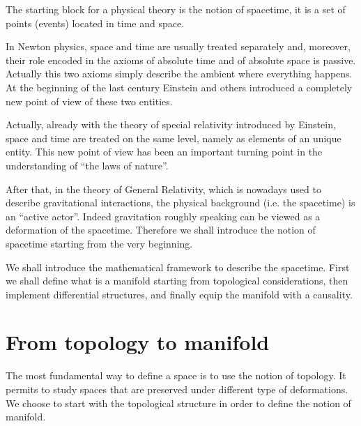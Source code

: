 \documentclass[11pt]{book}
\theoremstyle{break}
\begin{document}
\bigskip

The starting block for a physical theory is the notion of spacetime, it is a set of points (events) located in time and space. 


In Newton physics, space and time are usually treated separately and, moreover, their role encoded in the axioms of absolute time and of absolute space is passive. Actually this two axioms simply describe the ambient where everything happens. At the beginning of the last century Einstein and others introduced a completely new point of view of these two entities.


Actually, already with the theory of special relativity introduced by Einstein, space and time are treated on the same level, namely as elements of an unique entity. This new point of view has been an important turning point in the understanding of ``the laws of nature''.


After that, in the theory of General Relativity, which is nowadays used to describe gravitational interactions, the physical background (i.e. the spacetime) is an ``active actor''. Indeed gravitation roughly speaking can be viewed as a deformation of the spacetime. Therefore we shall introduce the notion of spacetime starting from the very beginning.


We shall introduce the mathematical framework to describe the spacetime. First we shall define what is a manifold starting from topological considerations, then implement differential structures, and finally equip the manifold with a causality.


\section{From topology to manifold}
\label{p:TOPO_M}


The most fundamental way to define a space is to use the notion of topology. It permits to study spaces that are preserved under different type of deformations. We choose to start with the topological structure in order to define the notion of manifold.
\end{document}
